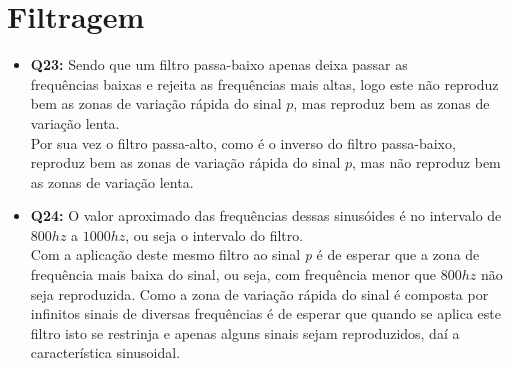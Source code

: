 \documentclass[a4paper, 12pt]{article}
\begin{document}
\section{Filtragem}
\begin{itemize}
    \item \textbf{Q23:} Sendo que um filtro passa-baixo apenas deixa passar as\\
          frequências baixas e rejeita as frequências mais altas, logo este não reproduz bem as zonas de variação rápida do sinal $p$, mas reproduz bem as zonas de variação lenta.\\
          Por sua vez o filtro passa-alto, como é o inverso do filtro passa-baixo, reproduz bem as zonas de variação rápida do sinal $p$, mas não reproduz bem as zonas de variação lenta.
    \item \textbf{Q24:} O valor aproximado das frequências dessas sinusóides é no intervalo de $800hz$ a $1000hz$, ou seja o intervalo do filtro.\\
          Com a aplicação deste mesmo filtro ao sinal \textit{p} é de esperar que a zona de frequência mais baixa do sinal, ou seja, com frequência menor que $800hz$ não seja reproduzida. Como a zona de variação rápida do sinal é composta por infinitos sinais de diversas frequências é de esperar que quando se aplica este filtro isto se restrinja e apenas alguns sinais sejam reproduzidos, daí a característica sinusoidal.
\end{itemize}
\newpage
\end{document}
